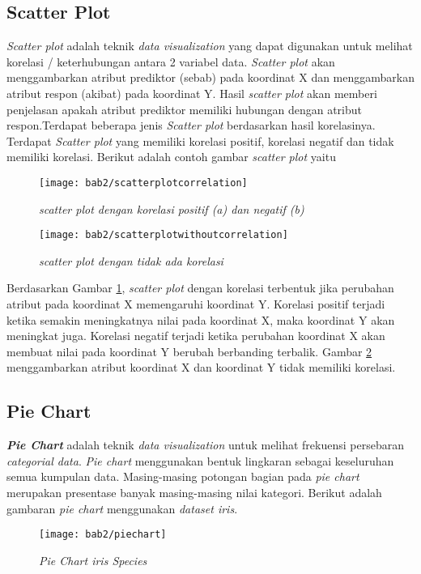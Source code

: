  
\subsection{\textbf{Scatter Plot}} 
 \textit{Scatter plot} adalah teknik \textit{data visualization} yang dapat digunakan untuk melihat korelasi / keterhubungan antara 2 variabel data. \textit{Scatter plot} akan menggambarkan atribut prediktor (sebab) pada koordinat X dan menggambarkan atribut respon (akibat) pada koordinat Y. Hasil \textit{scatter plot} akan memberi penjelasan apakah atribut prediktor memiliki hubungan dengan atribut respon.Terdapat beberapa jenis \textit{Scatter plot} berdasarkan hasil korelasinya. Terdapat \textit{Scatter plot} yang memiliki korelasi positif, korelasi negatif dan tidak memiliki korelasi. Berikut adalah contoh gambar \textit{scatter plot} yaitu
 
\pagebreak
		\begin{figure}[h!]
		\centering  
		\texttt{[image: bab2/scatterplotcorrelation]}   
		\caption{\textit{scatter plot dengan korelasi positif (a) dan negatif (b)}}
		\label{fig:scatterplotcorrelation} 
	\end{figure} 
	
	\begin{figure}[h!]
		\centering  
		\texttt{[image: bab2/scatterplotwithoutcorrelation]}   
		\caption{\textit{scatter plot dengan tidak ada korelasi }}
		\label{fig:scatterplotwithoutcorrelation} 
	\end{figure} 
	
Berdasarkan Gambar \ref{fig:scatterplotcorrelation}, \textit{scatter plot} dengan korelasi terbentuk jika perubahan atribut pada koordinat X memengaruhi koordinat Y. Korelasi positif terjadi ketika semakin meningkatnya nilai pada koordinat X, maka koordinat Y akan meningkat juga. Korelasi negatif terjadi ketika perubahan koordinat X akan membuat nilai pada koordinat Y berubah berbanding terbalik. Gambar \ref{fig:scatterplotwithoutcorrelation} menggambarkan atribut koordinat X dan koordinat Y tidak memiliki korelasi.  

\subsection{\textbf{Pie Chart}}
\textbf{\textit{Pie Chart}} adalah teknik \textit{data visualization} untuk melihat frekuensi persebaran \textit{categorial data}. \textit{Pie chart} menggunakan bentuk lingkaran sebagai keseluruhan semua kumpulan data. Masing-masing potongan bagian pada \textit{pie chart} merupakan presentase banyak masing-masing nilai kategori. Berikut adalah gambaran \textit{pie chart} menggunakan \textit{dataset iris}. 
\pagebreak	
	\begin{figure}[h!]
		\centering  
		\texttt{[image: bab2/piechart]}   
		\caption{\textit{Pie Chart iris Species }}
		\label{fig:piechart} 
	\end{figure}
	

